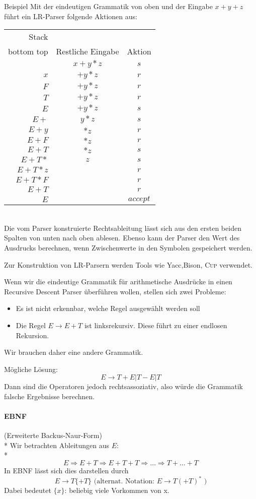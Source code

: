 \documentclass[a4paper]{scrartcl}
\begin{document}
Beispiel Mit der eindeutigen Grammatik von oben und der Eingabe $x+y+z$ führt ein LR-Parser folgende Aktionen aus:\\
\begin{tabular}{r|c|c}
Stack\\
bottom  top & Restliche Eingabe & Aktion\\ \hline
 & $x+y*z$ & $s$ \\
 $x$ & $+y*z$ & $r$\\
 $F$ & $+y*z$ & $r$\\
 $T$ & $+y*z$ & $r$\\
 $E$ & $+y*z$ & $s$\\
 $E+$ & $y*z$ & $s$\\
 $E+y$ & $*z$ & $r$\\
 $E+F$ & $*z$ & $r$\\
 $E+T$ & $*z$ & $s$\\
 $E+T*$ & $z$ & $s$\\
 $E+T*z$ & & $r$\\
 $E+T*F$ & & $r$\\
 $E+T$ & & $r$\\
 $E$ & & $accept$\\
\end{tabular}\\
Die vom Parser konstruierte Rechtsableitung lässt sich aus den ersten beiden Spalten von unten nach oben ablesen.
Ebenso kann der Parser den Wert des Ausdrucks berechnen, wenn Zwischenwerte in den Symbolen gespeichert werden.

Zur Konstruktion von LR-Parsern werden Tools wie Yacc,Bison, \textsc{Cup} verwendet.

Wenn wir die eindeutige Grammatik für arithmetische Ausdrücke in einen Recursive Descent Parser überführen wollen, stellen sich zwei Probleme:
\begin{itemize}
\item Es ist nicht erkennbar, welche Regel ausgewählt werden soll
\item Die Regel $E \rightarrow E+T$ ist linksrekursiv. Diese führt zu einer endlosen Rekursion.
\end{itemize}
Wir brauchen daher eine andere Grammatik.

Mögliche Lösung:
\[ E \rightarrow T+E | T-E | T \]
Dann sind die Operatoren jedoch rechtsassoziativ, also würde die Grammatik falsche Ergebnisse berechnen.

\paragraph{EBNF}(Erweiterte Backus-Naur-Form)\\*
Wir betrachten Ableitungen aus $E$:\\*
\[ E \Rightarrow E + T \Rightarrow E+T+T \Rightarrow \dots \Rightarrow T + \dots + T \]
In EBNF lässt sich dies darstellen durch
\[ E \rightarrow T \{ +T \} \text{ (alternat. Notation: } E \rightarrow T (+T)^* \text{ )} \]
Dabei bedeutet $\{x\}$: beliebig viele Vorkommen von x.
\end{document}
